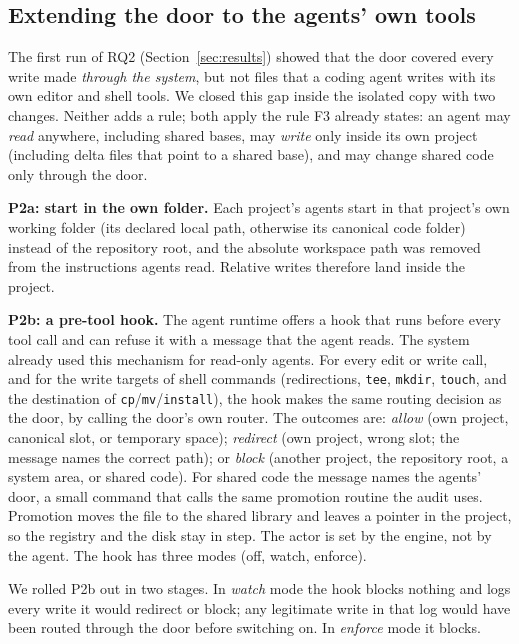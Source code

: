 \subsection{Extending the door to the agents' own tools}\label{sec:p2}
The first run of RQ2 (Section~\ref{sec:results}) showed that the door covered every write made \emph{through the system}, but not files that a coding agent writes with its own editor and shell tools. We closed this gap inside the isolated copy with two changes. Neither adds a rule; both apply the rule F3 already states: an agent may \emph{read} anywhere, including shared bases, may \emph{write} only inside its own project (including delta files that point to a shared base), and may change shared code only through the door.
\begin{description}[\IEEEsetlabelwidth{}]
\item[] \textbf{P2a: start in the own folder.} Each project's agents start in that project's own working folder (its declared local path, otherwise its canonical code folder) instead of the repository root, and the absolute workspace path was removed from the instructions agents read. Relative writes therefore land inside the project.
\item[] \textbf{P2b: a pre-tool hook.} The agent runtime offers a hook that runs before every tool call and can refuse it with a message that the agent reads. The system already used this mechanism for read-only agents. For every edit or write call, and for the write targets of shell commands (redirections, \texttt{tee}, \texttt{mkdir}, \texttt{touch}, and the destination of \texttt{cp}/\texttt{mv}/\texttt{install}), the hook makes the same routing decision as the door, by calling the door's own router. The outcomes are: \emph{allow} (own project, canonical slot, or temporary space); \emph{redirect} (own project, wrong slot; the message names the correct path); or \emph{block} (another project, the repository root, a system area, or shared code). For shared code the message names the agents' door, a small command that calls the same promotion routine the audit uses. Promotion moves the file to the shared library and leaves a pointer in the project, so the registry and the disk stay in step. The actor is set by the engine, not by the agent. The hook has three modes (off, watch, enforce).
\end{description}
We rolled P2b out in two stages. In \emph{watch} mode the hook blocks nothing and logs every write it would redirect or block; any legitimate write in that log would have been routed through the door before switching on. In \emph{enforce} mode it blocks.
